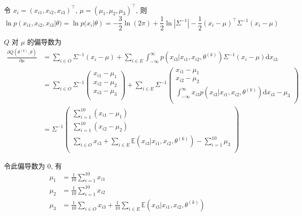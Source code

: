 \documentclass[openany]{ctexbook}
\theoremstyle{kaiti}
\theoremstyle{normal}
\begin{document}
令 $x_i=(x_{i1},x_{i2},x_{i3})^{\top}$, $\mu=(\mu_1,\mu_2,\mu_3)^{\top}$, 则
\begin{equation}
  \ln p(x_{i1},x_{i2},x_{i3}|\theta)=\ln p(x_i|\theta)=-\frac{3}{2}\ln(2\pi)+\frac{1}{2}\ln|\Sigma^{-1}|-\frac{1}{2}(x_i-\mu)^{\top}\Sigma^{-1}(x_i-\mu)
\end{equation}

$Q$ 对 $\mu$ 的偏导数为
\begin{equation}
  \begin{aligned}
    \frac{\partial Q(\theta^{(k)},\theta)}{\partial \mu}
    &=\sum_{i\in O}\Sigma^{-1}(x_i-\mu)+\sum_{i\in E}\int_{-\infty}^\infty p(x_{i3}|x_{i1},x_{i2},\theta^{(k)})\Sigma^{-1}(x_i-\mu)\mathrm{d}x_{i3}\\
    &=\sum_{i\in O}\Sigma^{-1}
      \begin{pmatrix}
        x_{i1}-\mu_1\\
        x_{i2}-\mu_2\\
        x_{i3}-\mu_3\\
      \end{pmatrix}
    +\sum_{i\in E}\Sigma^{-1}
      \begin{pmatrix}
        x_{i1}-\mu_1\\
        x_{i2}-\mu_2\\
        \displaystyle\int_{-\infty}^\infty x_{i3} p(x_{i3}|x_{i1},x_{i2},\theta^{(k)})\mathrm{d}x_{i3}-\mu_3\\
      \end{pmatrix}\\
    &=\Sigma^{-1}
      \begin{pmatrix}
        \displaystyle\sum_{i=1}^{10}(x_{i1}-\mu_1)\\
        \displaystyle\sum_{i=1}^{10}(x_{i2}-\mu_2)\\
        \displaystyle\sum_{i\in O}x_{i3}+\sum_{i\in E}\mathbb{E}(x_{i3}|x_{i1},x_{i2},\theta^{(k)})-\sum_{i=1}^{10}\mu_3\\
      \end{pmatrix}
  \end{aligned}
\end{equation}

令此偏导数为 0, 有
\begin{equation}
  \begin{aligned}
    \mu_1&=\frac{1}{10}\sum_{i=1}^{10}x_{i1}\\
    \mu_2&=\frac{1}{10}\sum_{i=1}^{10}x_{i2}\\
    \mu_3&=\frac{1}{10}\sum_{i\in O}x_{i3}+\frac{1}{10}\sum_{i\in E}\mathbb{E}(x_{i3}|x_{i1},x_{i2},\theta^{(k)})\\
  \end{aligned}
\end{equation}
\end{document}
